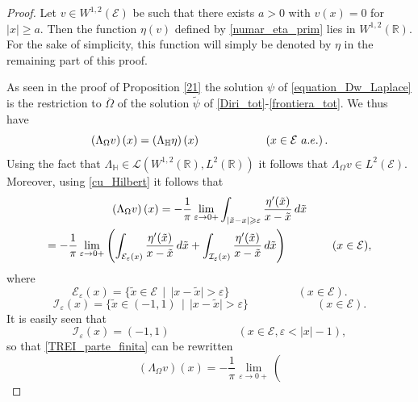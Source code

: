 \documentclass[10pt,a4paper]{amsart}
\begin{document}
\begin{proof}
Let $v\in W^{1,2}(\mathcal{E})$ be such that there exists $a>0$ with $v(x)=0$ for  $|x|\geqslant a$. Then the function $\eta(v)$ defined by
\eqref{numar_eta_prim} lies in $W^{1,2}(\mathbb{R})$. For the sake of simplicity, this function will simply be denoted by $\eta$ in the remaining part of this proof.

As seen in the proof of Proposition \ref{21}
the solution $\psi$ of \eqref{equation_Dw_Laplace} is the restriction to $\overline\Omega$ of the
solution $\tilde\psi$ of   \eqref{Diri_tot}-\eqref{frontiera_tot}. We thus have
\begin{equation}\label{simetria}
\left(\Lambda_\Omega v\right)(x)=\left(\Lambda_\mathbb{H} \eta\right)(x) \qquad\qquad\qquad(x\in \mathcal{E}\ {\rm a.e.})\, .
\end{equation}
Using the fact that $\Lambda_\mathbb{H}\in \mathcal{L}(W^{1,2}(\mathbb{R}),L^2(\mathbb{R}))$ it follows that $\Lambda_\Omega v\in L^2(\mathcal{E})$.
Moreover, using \eqref{cu_Hilbert} it follows that
\begin{multline}\label{TREI_parte_finita}
\left(\Lambda_\Omega v\right)(x)= - \frac1\pi  \lim_{\varepsilon\to 0+}
\int_{|\tilde x-x|\geqslant\varepsilon} \frac{\eta'(\tilde x)}{x-\tilde x}\, {\rm d}\tilde x\\
=-\frac1\pi  \lim_{\varepsilon\to 0+} \left(
\int_{\mathcal{E}_\varepsilon(x)} \frac{\eta'(\tilde x)}{x-\tilde x}\, {\rm d}\tilde x +
\int_{\mathcal{I}_\varepsilon(x)} \frac{\eta'(\tilde x)}{x-\tilde x}\, {\rm d}\tilde x\right)
\qquad\qquad( x\in \mathcal{E}),
\end{multline}
where
\begin{equation}\label{defeeps}
 \mathcal{E}_{\varepsilon}(x)=\{\tilde x\in \mathcal{E}\ \ |\ \ |x-\tilde x|>\varepsilon\} \qquad\qquad\qquad(x\in \mathcal{E}).
 \end{equation}
\begin{equation}\label{defieps}
 \mathcal{I}_{\varepsilon}(x)=\{\tilde x\in (-1,1)\ \ |\ \ |x-\tilde x|>\varepsilon\} \qquad\qquad\qquad(x\in \mathcal{E}).
 \end{equation}
 It is easily seen that
\begin{equation}\label{defieps_noua}
 \mathcal{I}_{\varepsilon}(x)=(-1,1) \qquad\qquad\qquad(x\in \mathcal{E}, \varepsilon <|x|-1),
 \end{equation}
 so that \eqref{TREI_parte_finita} can be rewritten
\begin{equation}\label{TREI_parte_finita_bus}
\left(\Lambda_\Omega v\right)(x)= - \frac1\pi  \lim_{\varepsilon\to 0+} \left(

\end{equation}
\end{proof}
\end{document}
